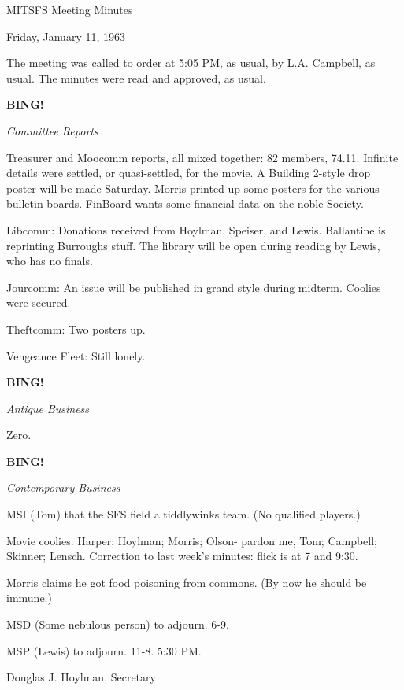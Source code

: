 \documentclass[12pt]{article}
\newcommand{\bing}{{\bf BING!} }
\newcommand{\goto}[1]{\bing \vskip 12pt \centerline{{\em{#1}}}}
\begin{document}
\begin{center}

MITSFS Meeting Minutes

Friday, January 11, 1963

\end{center}
 
\vspace{12pt}

\setlength{\parskip}{6pt}

\noindent
The meeting was called to order at 5:05 PM, as usual, by L.A. Campbell, as usual. The minutes were read and approved, as usual.

\goto{Committee Reports}

Treasurer and Moocomm reports, all mixed together: 82 members, 74.11. Infinite details were settled, or quasi-settled, for the movie. A Building 2-style drop poster will be made Saturday. Morris printed up some posters for the various bulletin boards. FinBoard wants some financial data on the noble Society.

Libcomm: Donations received from Hoylman, Speiser, and Lewis. Ballantine is reprinting Burroughs stuff. The library will be open during reading by Lewis, who has no finals.

Jourcomm: An issue will be published in grand style during midterm. Coolies were secured.

Theftcomm: Two posters up.

Vengeance Fleet: Still lonely.

\goto{Antique Business}

Zero.

\goto{Contemporary Business}

MSI (Tom) that the SFS field a tiddlywinks team. (No qualified players.)

Movie coolies: Harper; Hoylman; Morris; Olson- pardon me, Tom; Campbell; Skinner; Lensch. Correction to last week's minutes: flick is at 7 and 9:30.

Morris claims he got food poisoning from commons. (By now he should be immune.)

MSD (Some nebulous person) to adjourn. 6-9.

MSP (Lewis) to adjourn. 11-8. 5:30 PM.

\vspace{12pt}

\centerline{Douglas J. Hoylman, Secretary}
\end{document}

